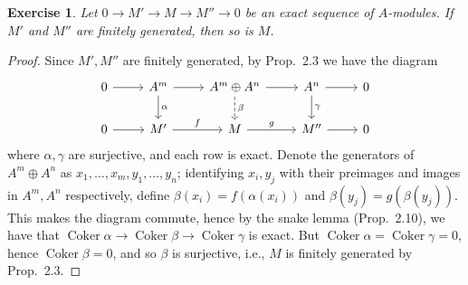 \documentclass[12pt,letterpaper]{article}
\newtheorem{problem}{Exercise}[section]
\theoremstyle{definition}
\theoremstyle{remark}
\numberwithin{figure}{problem}
\numberwithin{equation}{section}
\let\Im\relax
\DeclareMathOperator{\Im}{Im}
\let\ker\relax
\DeclareMathOperator{\ker}{Ker}
\DeclareMathOperator{\Coker}{Coker}
\begin{document}
\begin{problem}
  Let
  $0 \to M' \to M \to M'' \to
  0$ be an exact sequence of
  $A$-modules.
  If
  $M'$ and
  $M''$ are finitely generated, then so is
  $M$.
\end{problem}
\begin{proof}
  Since
  $M',M''$ are finitely generated, by Prop.~2.3 we have the diagram
  \begin{equation*}
    \begin{tikzcd}
      0 \rar & A^m \rar\dar{\alpha} &
      A^{m} \oplus A^n \rar\dar[dashed]{\beta} &
      A^n \rar\dar{\gamma} &
      0\\
      0 \rar &
      M' \rar{f} &
      M \rar{g} &
      M'' \rar &
      0
    \end{tikzcd}
  \end{equation*}
  where
  $\alpha,\gamma$ are surjective, and each row is exact.
  Denote the generators of
  $A^{m} \oplus
  A^n$ as
  $x_1,\ldots,x_m,y_1,\ldots,y_n$; identifying
  $x_i,y_j$ with their preimages and images in
  $A^m,A^n$ respectively, define
  $\beta(x_i) =
  f(\alpha(x_i))$ and
  $\beta(y_j) =
  g(\beta(y_j))$.
  This makes the diagram commute, hence by the snake lemma (Prop.~2.10), we have that
  $\Coker \alpha \to \Coker \beta \to \Coker
  \gamma$ is exact.
  But
  $\Coker \alpha = \Coker \gamma =
  0$, hence
  $\Coker \beta =
  0$, and so
  $\beta$ is surjective, i.e.,
  $M$ is finitely generated by Prop.~2.3.
\end{proof}
\end{document}
